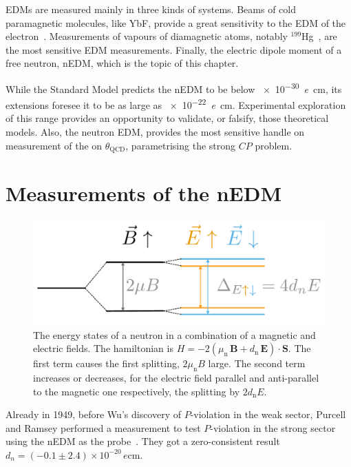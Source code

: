 EDMs are measured mainly in three kinds of systems. Beams of cold paramagnetic molecules, like YbF, provide a great sensitivity to the EDM of the electron~\cite{Hudson2011}. Measurements of vapours of diamagnetic atoms, notably $^{199}$Hg~\cite{PhysRevLett.116.161601}, are the most sensitive EDM measurements. Finally, the electric dipole moment of a free neutron, nEDM, which is the topic of this chapter.

While the Standard Model predicts the nEDM to be below \SI{e-30}{\elementarycharge\centi\meter}, its extensions foresee it to be
as large as \SI{e-22}{\elementarycharge\centi\meter}.
Experimental exploration of this range provides an opportunity to validate, or falsify, those theoretical models. Also, the neutron EDM, provides the most sensitive handle on measurement of the on $\theta_\text{QCD}$, parametrising the strong $CP$ problem.



\section{Measurements of the nEDM}

\begin{figure}
  \centering
  \includegraphics[width=0.7\linewidth]{gfx/introduction/measurement_principle.pdf}
  \caption{The energy states of a neutron in a combination of a magnetic and electric fields. The hamiltonian is $H = - 2 \left( \mu_\text{n} \, \bm{B} + d_\text{n} \, \bm{E} \right ) \cdot \bm{S}$. The first term causes the first splitting, $2\mu_\text{n} B$ large. The second term increases or decreases, for the electric field parallel and anti-parallel to the magnetic one respectively, the splitting by $2 d_\text{n} E$.}
  \label{fig:nEDM_measurement_principle}
\end{figure}

Already in 1949, before Wu's discovery of $P$-violation in the weak sector, Purcell and Ramsey performed a measurement to test $P$-violation in the strong sector using the nEDM as the probe~\cite{PhysRev.108.120}. They got a zero-consistent result $d_n = (-0.1 \pm 2.4) \times 10^{-20}\,\si{\elementarycharge\centi\meter}$.

